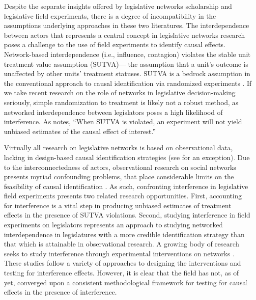 \documentclass[12pt]{article}
\begin{document}
Despite the separate insights offered by legislative networks scholarship and legislative field experiments, there is a degree of incompatibility in the assumptions underlying approaches in these two literatures. The interdependence between actors that represents a central concept in legislative networks research poses a challenge to the use of field experiments to identify causal effects. Network-based interdependence (i.e., influence, contagion) violates the stable unit treatment value assumption (SUTVA)--- the assumption that a unit's outcome is unaffected by other units' treatment statuses. SUTVA is a bedrock assumption in the conventional approach to causal identification via randomized experiments \citep{sekhon2008}.  If we take recent research on the role of networks in legislative decision-making seriously, simple randomization to treatment is likely not a robust method, as networked interdependence between legislators poses a high likelihood of interference.  As \citet[p. 5]{sekhon2008} notes, ``When SUTVA is violated, an experiment will not yield unbiased estimates of the causal effect of interest.''  

Virtually all research on legislative networks is based on observational data, lacking in design-based causal identification strategies (see \citet{rogowski2012estimating} for an exception). Due to the interconnectedness of actors, observational research on social networks presents myriad confounding problems, that place considerable limits on the feasibility of causal identification \citep{Shalizi:2011}. As such, confronting interference in legislative field experiments presents two related research opportunities. First, accounting for interference is a vital step in producing unbiased estimates of treatment effects in the presence of SUTVA violations. Second, studying interference in field experiments on legislators represents an approach to studying networked interdependence in legislatures with a more credible identification strategy than that which is attainable in observational research. A growing body of research seeks to study interference through experimental interventions on networks \citep[e.g., ][]{gerber2008,paluck2011,Bond:2012,muchnik2013,aral2014,bapna2015,Ben-AaronPAR}. These studies follow a variety of approaches to designing the interventions and testing for interference effects. However, it is clear that the field has not, as of yet, converged upon a consistent methodological framework for testing for causal effects in the presence of interference. 
\end{document}
